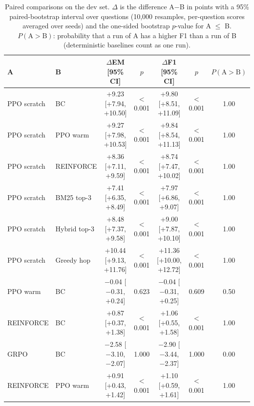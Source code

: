 \begin{table}[t]
\centering
\footnotesize
\caption{Paired comparisons on the dev set. $\Delta$ is the difference A$-$B in points with a 95\% paired-bootstrap interval over questions (10{,}000 resamples, per-question scores averaged over seeds) and the one-sided bootstrap $p$-value for A $\le$ B. $P(\mathrm{A}>\mathrm{B})$: probability that a run of A has a higher F1 than a run of B (deterministic baselines count as one run).}
\label{tab:tests}
\setlength{\tabcolsep}{4pt}
\begin{tabular}{@{}llccccc@{}}
\toprule
A & B & $\Delta$EM [95\% CI] & $p$ & $\Delta$F1 [95\% CI] & $p$ & $P(\mathrm{A}>\mathrm{B})$ \\
\midrule
PPO scratch & BC & +9.23 [+7.94, +10.50] & $<$0.001 & +9.80 [+8.51, +11.09] & $<$0.001 & 1.00 \\
PPO scratch & PPO warm & +9.27 [+7.98, +10.53] & $<$0.001 & +9.84 [+8.54, +11.13] & $<$0.001 & 1.00 \\
PPO scratch & REINFORCE & +8.36 [+7.11, +9.59] & $<$0.001 & +8.74 [+7.47, +10.02] & $<$0.001 & 1.00 \\
PPO scratch & BM25 top-3 & +7.41 [+6.35, +8.49] & $<$0.001 & +7.97 [+6.86, +9.07] & $<$0.001 & 1.00 \\
PPO scratch & Hybrid top-3 & +8.48 [+7.37, +9.58] & $<$0.001 & +9.00 [+7.87, +10.10] & $<$0.001 & 1.00 \\
PPO scratch & Greedy hop & +10.44 [+9.13, +11.76] & $<$0.001 & +11.36 [+10.00, +12.72] & $<$0.001 & 1.00 \\
PPO warm & BC & $-$0.04 [$-$0.31, +0.24] & 0.623 & $-$0.04 [$-$0.31, +0.25] & 0.609 & 0.50 \\
REINFORCE & BC & +0.87 [+0.37, +1.38] & $<$0.001 & +1.06 [+0.55, +1.58] & $<$0.001 & 1.00 \\
GRPO & BC & $-$2.58 [$-$3.10, $-$2.07] & 1.000 & $-$2.90 [$-$3.44, $-$2.37] & 1.000 & 0.00 \\
REINFORCE & PPO warm & +0.91 [+0.43, +1.42] & $<$0.001 & +1.10 [+0.59, +1.61] & $<$0.001 & 1.00 \\
\bottomrule
\end{tabular}
\end{table}
